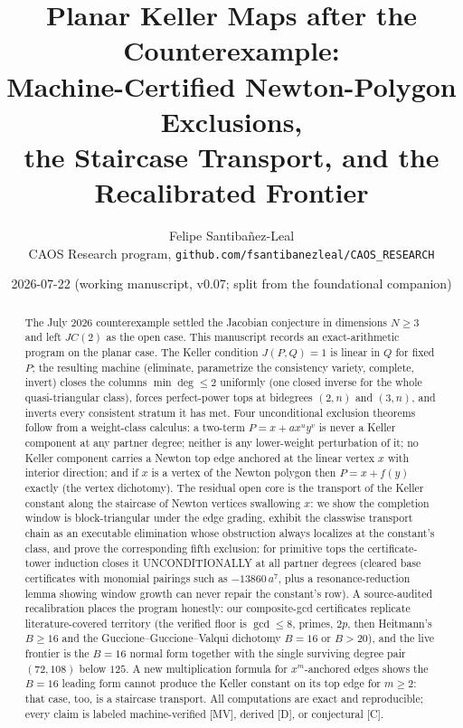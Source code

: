\documentclass[11pt]{article}
\title{Planar Keller Maps after the Counterexample:\\
Machine-Certified Newton-Polygon Exclusions,\\
the Staircase Transport, and the Recalibrated Frontier}
\author{Felipe Santiba\~nez-Leal\\
\small CAOS Research program, \texttt{github.com/fsantibanezleal/CAOS\_RESEARCH}}
\date{2026-07-22 (working manuscript, v0.07; split from the foundational companion)}
\theoremstyle{remark}
\begin{document}
\maketitle

\begin{abstract}
The July 2026 counterexample settled the Jacobian conjecture in dimensions $N \ge 3$ and left
$JC(2)$ as the open case. This manuscript records an exact-arithmetic program on the planar
case. The Keller condition $J(P, Q) = 1$ is linear in $Q$ for fixed $P$; the resulting machine
(eliminate, parametrize the consistency variety, complete, invert) closes the columns
$\min\deg \le 2$ uniformly (one closed inverse for the whole quasi-triangular class), forces
perfect-power tops at bidegrees $(2, n)$ and $(3, n)$, and inverts every consistent stratum it
has met. Four unconditional exclusion theorems follow from a weight-class calculus: a two-term
$P = x + a x^u y^v$ is never a Keller component at any partner degree; neither is any
lower-weight perturbation of it; no Keller component carries a Newton top edge anchored at the
linear vertex $x$ with interior direction; and if $x$ is a vertex of the Newton polygon then
$P = x + f(y)$ exactly (the vertex dichotomy). The residual open core is the transport of the
Keller constant along the staircase of Newton vertices swallowing $x$: we show the completion
window is block-triangular under the edge grading, exhibit the classwise transport chain as an
executable elimination whose obstruction always localizes at the constant's class, and prove the corresponding
fifth exclusion: for primitive tops the certificate-tower induction closes it
UNCONDITIONALLY at all partner degrees (cleared base certificates with monomial pairings
such as $-13860\,a^7$, plus a resonance-reduction lemma showing window growth can never
repair the constant's row). A source-audited recalibration places the program
honestly: our composite-gcd certificates replicate literature-covered territory (the verified
floor is $\gcd \le 8$, primes, $2p$, then Heitmann's $B \ge 16$ and the
Guccione--Guccione--Valqui dichotomy $B = 16$ or $B > 20$), and the live frontier is the
$B = 16$ normal form together with the single surviving degree pair $(72, 108)$ below $125$.
A new multiplication formula for $x^m$-anchored edges shows the $B = 16$ leading form cannot
produce the Keller constant on its top edge for $m \ge 2$: that case, too, is a staircase
transport. All computations are exact and reproducible; every claim is labeled machine-verified
[MV], derived [D], or conjectural [C].
\end{abstract}
\end{document}
